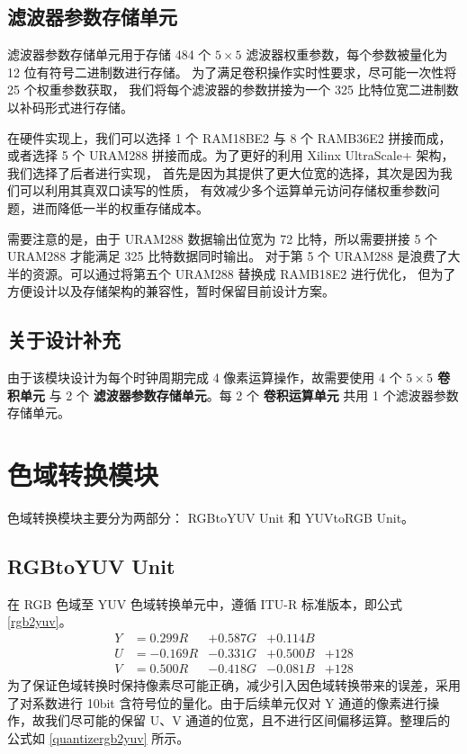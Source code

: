 \documentclass[12pt, a4paper, oneside]{ctexbook}
\begin{document}
	\subsection{滤波器参数存储单元}
	滤波器参数存储单元用于存储 484 个 $5\times5$ 滤波器权重参数，每个参数被量化为 12 位有符号二进制数进行存储。
	为了满足卷积操作实时性要求，尽可能一次性将 25 个权重参数获取，
	我们将每个滤波器的参数拼接为一个 325 比特位宽二进制数以补码形式进行存储。
	\par 在硬件实现上，我们可以选择 1 个 RAM18BE2 与 8 个 RAMB36E2 拼接而成，
	或者选择 5 个 URAM288 拼接而成。为了更好的利用 Xilinx UltraScale+ 架构，我们选择了后者进行实现，
	首先是因为其提供了更大位宽的选择，其次是因为我们可以利用其真双口读写的性质，
	有效减少多个运算单元访问存储权重参数问题，进而降低一半的权重存储成本。
	\par 需要注意的是，由于 URAM288 数据输出位宽为 72 比特，所以需要拼接 5 个 URAM288 才能满足 325 比特数据同时输出。
	对于第 5 个 URAM288 是浪费了大半的资源。可以通过将第五个 URAM288 替换成 RAMB18E2 进行优化，
	但为了方便设计以及存储架构的兼容性，暂时保留目前设计方案。
	\subsection{关于设计补充} 
	由于该模块设计为每个时钟周期完成 4 像素运算操作，故需要使用 4 个 \textbf{ $5\times5$ 卷积单元} 与 2 个 \textbf{滤波器参数存储单元}。每 2 个 \textbf{卷积运算单元} 共用 1 个滤波器参数存储单元。
	
	\section{色域转换模块}
	色域转换模块主要分为两部分： RGBtoYUV Unit 和 YUVtoRGB Unit。
	
	\subsection{RGBtoYUV Unit}
	在 RGB 色域至 YUV 色域转换单元中，遵循 ITU-R 标准版本，即公式 \ref{rgb2yuv}。
	\begin{equation} \label{rgb2yuv}
		\begin{aligned}
			Y &= 0.299R &+ 0.587G &+ 0.114B \\
			U &= -0.169R &- 0.331G& + 0.500B &+ 128 \\
			V &= 0.500R &- 0.418G &- 0.081B &+ 128
		\end{aligned}
	\end{equation}
	为了保证色域转换时保持像素尽可能正确，减少引入因色域转换带来的误差，采用了对系数进行 10bit 含符号位的量化。由于后续单元仅对 Y 通道的像素进行操作，故我们尽可能的保留 U、V 通道的位宽，且不进行区间偏移运算。整理后的公式如 \ref{quantizergb2yuv} 所示。
	
\end{document}
